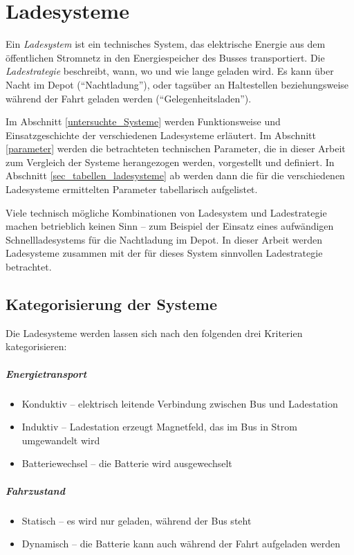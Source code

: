 \chapter{Ladesysteme}
Ein \emph{Ladesystem} ist ein technisches System, das elektrische Energie aus dem öffentlichen Stromnetz in den Energiespeicher des Busses transportiert. Die \emph{Ladestrategie} beschreibt, wann, wo und wie lange geladen wird. Es kann über Nacht im Depot ("`Nachtladung"'), oder tagsüber an Haltestellen beziehungsweise während der Fahrt geladen werden ("`Gelegenheitsladen"').

Im  Abschnitt \ref{untersuchte_Systeme} werden Funktionsweise und Einsatzgeschichte der verschiedenen Ladesysteme erläutert. Im Abschnitt \ref{parameter} werden die betrachteten technischen Parameter, die in dieser Arbeit zum Vergleich der Systeme herangezogen werden, vorgestellt und definiert. In Abschnitt \ref{sec_tabellen_ladesysteme} ab werden dann die für die verschiedenen Ladesysteme ermittelten Parameter tabellarisch aufgelistet. 

Viele technisch mögliche Kombinationen von Ladesystem und Ladestrategie machen betrieblich keinen Sinn – zum Beispiel der Einsatz eines aufwändigen Schnellladesystems für die Nachtladung im Depot. In dieser Arbeit werden Ladesysteme zusammen mit der für dieses System sinnvollen Ladestrategie betrachtet.

\section{Kategorisierung der Systeme}
Die Ladesysteme werden lassen sich nach den folgenden drei Kriterien kategorisieren:

\paragraph{Energietransport}
\begin{itemize}
	\item Konduktiv – elektrisch leitende Verbindung zwischen Bus und Ladestation
	\item Induktiv – Ladestation erzeugt Magnetfeld, das im Bus in Strom umgewandelt wird
	\item Batteriewechsel – die Batterie wird ausgewechselt
\end{itemize}

\paragraph{Fahrzustand}
\begin{itemize}
	\item Statisch – es wird nur geladen, während der Bus steht
	\item Dynamisch – die Batterie kann auch während der Fahrt aufgeladen werden
\end{itemize}

